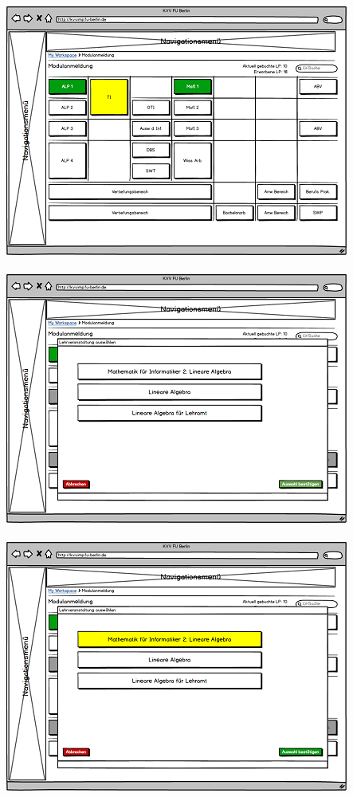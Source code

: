 \documentclass{article}
\begin{document}
\includegraphics{img/ucd_ppt_start.png}\\
\\
\includegraphics{img/ucd_ppt_lv_select.png}\\
\\
\includegraphics{img/ucd_ppt_lv_selected.png}\\
\end{document}
